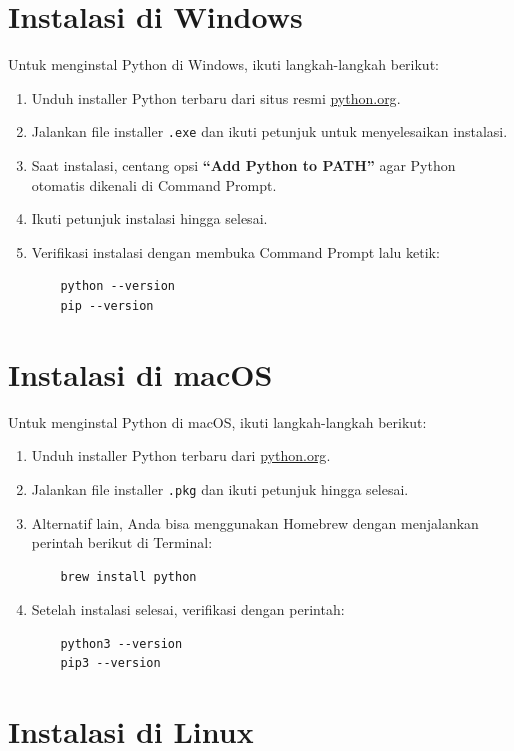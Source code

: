\section{Instalasi di Windows}
Untuk menginstal Python di Windows, ikuti langkah-langkah berikut:

\begin{enumerate}
\item Unduh installer Python terbaru dari situs resmi \href{https://www.python.org/downloads/}{python.org}.
\item Jalankan file installer \texttt{.exe} dan ikuti petunjuk untuk menyelesaikan instalasi.
\item Saat instalasi, centang opsi \textbf{``Add Python to PATH''} agar Python otomatis dikenali di Command Prompt.
\item Ikuti petunjuk instalasi hingga selesai.
\item Verifikasi instalasi dengan membuka Command Prompt lalu ketik:
\begin{verbatim}
    python --version
    pip --version
\end{verbatim}
\end{enumerate}

\section{Instalasi di macOS}

Untuk menginstal Python di macOS, ikuti langkah-langkah berikut:

\begin{enumerate}
\item Unduh installer Python terbaru dari \href{https://www.python.org/downloads/macos/}{python.org}.
\item Jalankan file installer \texttt{.pkg} dan ikuti petunjuk hingga selesai.
\item Alternatif lain, Anda bisa menggunakan Homebrew dengan menjalankan perintah berikut di Terminal:
\begin{verbatim}
    brew install python
\end{verbatim}
\item Setelah instalasi selesai, verifikasi dengan perintah:
\begin{verbatim}
    python3 --version
    pip3 --version
\end{verbatim}
\end{enumerate}

\section{Instalasi di Linux}

